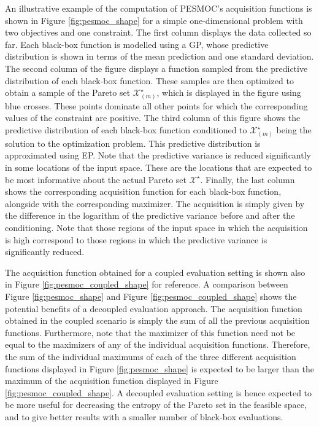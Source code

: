\documentclass[review,preprint,12pt]{elsarticle}
\begin{document}
An illustrative example of the computation of PESMOC's acquisition functions is shown in Figure 
\ref{fig:pesmoc_shape} for a simple one-dimensional problem with two objectives and one constraint. 
The first column displays the data collected so far. Each black-box function is 
modelled using a GP, whose predictive distribution is shown in terms of the mean 
prediction and one standard deviation. The second column of the figure displays a function sampled 
from the predictive distribution of each black-box function. These samples are then optimized to obtain a sample
of the Pareto set $\mathcal{X}^\star_{(m)}$, which is displayed in the figure using blue crosses.
These points dominate all other points for which the corresponding values 
of the constraint are positive. The third column of this figure shows the predictive distribution
of each black-box function conditioned to $\mathcal{X}^\star_{(m)}$ being the solution to the optimization
problem. This predictive distribution is approximated using EP. Note that the predictive variance
is reduced significantly in some locations of the input space. These are the locations that are expected to be most 
informative about the actual Pareto set $\mathcal{X}^\star$. Finally, the last column shows the corresponding
acquisition function for each black-box function, alongside with the corresponding maximizer. 
The acquisition is simply given by the difference in the logarithm of the predictive variance before and 
after the conditioning. Note that those regions of the input space in which the acquisition is high correspond to 
those regions in which the predictive variance is significantly reduced.

The acquisition function obtained for a coupled evaluation setting is shown also in 
Figure \ref{fig:pesmoc_coupled_shape} for reference. A comparison between Figure 
\ref{fig:pesmoc_shape} and Figure \ref{fig:pesmoc_coupled_shape} shows the potential 
benefits of a decoupled evaluation approach.
The acquisition function obtained in the coupled scenario is simply the sum of all the previous 
acquisition functions. Furthermore, note that the maximizer of this function need not be equal to the 
maximizers of any of the individual acquisition functions. Therefore, the sum of the individual maximums of 
each of the three different acquisition functions displayed in Figure \ref{fig:pesmoc_shape}
is expected to be larger than the maximum of the acquisition function displayed in Figure \ref{fig:pesmoc_coupled_shape}.
A decoupled evaluation setting is hence expected to be more useful for decreasing the entropy of the
Pareto set in the feasible space, and to give better results with a smaller number of black-box evaluations.
\end{document}
